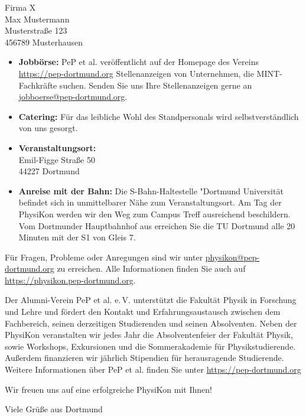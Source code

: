 \documentclass[
  pepbrief,
  fontsize=12pt,
  paper=a4,
  DIV=14,
  parskip=half,
  backaddress=false,
]{scrlttr2}
\begin{document}
\begin{letter}{%
  Firma X\\
  Max Mustermann\\
  Musterstraße 123\\
  456789 Musterhausen

}
\begin{itemize}
    \item \textbf{Jobbörse:} PeP et al. veröffentlicht auf der Homepage des Vereins \url{https://pep-dortmund.org} Stellenanzeigen von Unternehmen, die MINT-Fachkräfte suchen.
    Senden Sie uns Ihre Stellenanzeigen gerne an \href{mailto:jobboerse@pep-dortmund.org}{jobboerse@pep-dortmund.org}.
    \item \textbf{Catering:} Für das leibliche Wohl des Standpersonals wird selbstverständlich von uns gesorgt.
    \item \textbf{Veranstaltungsort:}
    \vspace{3mm}\\
    Emil-Figge Straße 50\\
    44227 Dortmund
    \item \textbf{Anreise mit der Bahn:} Die S-Bahn-Haltestelle "Dortmund Universität befindet sich in unmittelbarer Nähe zum Veranstaltungsort.
    Am Tag der PhysiKon werden wir den Weg zum Campus Treff ausreichend beschildern.
    Vom Dortmunder Hauptbahnhof aus erreichen Sie die TU Dortmund alle 20 Minuten mit der S1 von Gleis 7.
\end{itemize}

Für Fragen, Probleme oder Anregungen sind wir unter \href{mailto:physikon@pep-dortmund.org}{physikon@pep-dortmund.org} zu erreichen.
Alle Informationen finden Sie auch auf \url{https://physikon.pep-dortmund.org}.

Der Alumni-Verein PeP et al. e.\,V. unterstützt die Fakultät Physik in Forschung und Lehre und fördert den Kontakt und Erfahrungsaustausch zwischen dem Fachbereich,
seinen derzeitigen Studierenden und seinen Absolventen. Neben der PhysiKon veranstalten wir jedes Jahr die Absolventenfeier der Fakultät Physik, sowie Workshops, Exkursionen
und die Sommerakademie für Physikstudierende. Außerdem finanzieren wir jährlich Stipendien für herausragende Studierende. Weitere Informationen über PeP et al. finden Sie unter
\url{https://pep-dortmund.org}

Wir freuen uns auf eine erfolgreiche PhysiKon mit Ihnen!

\closing{Viele Grüße aus Dortmund}

\end{letter}
\end{document}

